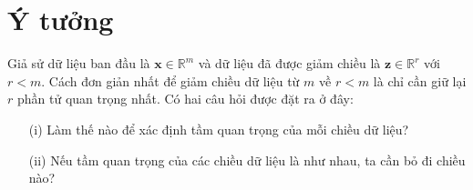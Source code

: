 \documentclass[12pt,a4paper,oneside]{report}
\numberwithin{equation}{section}
\begin{document}
\section{Ý tưởng}
Giả sử dữ liệu ban đầu là $\mathbf{x} \in \mathbb{R}^{m}$ và dữ liệu đã được giảm chiều là $\mathbf{z} \in \mathbb{R}^{r}$ với $r<m$. Cách đơn giản nhất để giảm chiều dữ liệu từ $m$ về $r<m$ là chỉ cần giữ lại $r$ phần tử quan trọng nhất. Có hai câu hỏi được đặt ra ở đây:
\begin{itemize}

\item[(i)] Làm thế nào để xác định tầm quan trọng của mỗi chiều dữ liệu?
\item[(ii)] Nếu tầm quan trọng của các chiều dữ liệu là như nhau, ta cần bỏ đi chiều nào?
	
\end{itemize}
\end{document}
